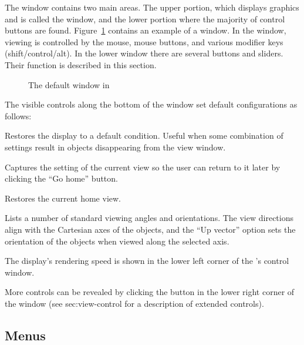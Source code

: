 The \viewer{} window contains two main areas.  The upper portion,
which displays graphics and is called the \graphics{} window, and the
lower portion where the majority of control buttons are found.
Figure~\ref{fig:viewwindow} contains an example of a \viewer{} window.
In the \graphics{} window, viewing is controlled by the mouse, mouse
buttons, and various modifier keys (shift/control/alt).  In the lower
window there are several buttons and sliders. Their function is
described in this section.

\begin{figure}[htb]
  \begin{makeimage}
  \end{makeimage}
  \viewerwindow
  \caption{\label{fig:viewwindow} The default \viewer{} window in \SR{}}
\end{figure}


The visible controls along the bottom of the \viewer{} window set default
configurations as follows:
%
\begin{description}
   Restores the display to a default
  condition.  Useful when some combination of settings result in
  objects disappearing from the view window.
  
   Captures the setting of the current view
  so the user can return to it later by clicking the ``Go home''
  button.

   Restores the current home view.
  
   Lists a number of standard viewing angles
  and orientations.  The view directions align with the Cartesian axes
  of the objects, and the ``Up vector'' option sets the orientation of
  the objects when viewed along the selected axis.
\end{description}

The display's rendering speed is shown in the lower left corner of the
\viewer{}'s control window.  

More controls can be revealed by clicking the
\latexhtml{\fbox{+}}{\button{[+]}} button in the lower right corner of
the \viewer{} window (see 
{sec:view-control} for a description of extended controls).


\subsection{Menus}

